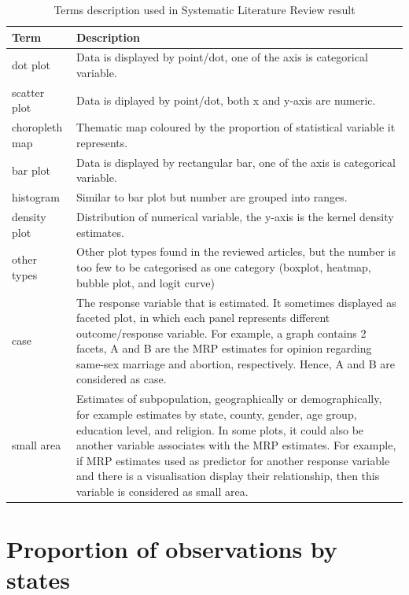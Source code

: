 \documentclass{monashthesis}
\begin{document}
\begin{table}

\caption{\label{tab:terms-desc}Terms description used in Systematic Literature Review result}
\centering
\begin{tabular}[t]{l>{\raggedright\arraybackslash}p{30em}}
\toprule
Term & Description\\
\midrule
dot plot & Data is displayed by point/dot, one of the axis is categorical variable.\\
scatter plot & Data is diplayed by point/dot, both x and y-axis are numeric.\\
choropleth map & Thematic map coloured by the proportion of statistical variable it represents.\\
bar plot & Data is displayed by rectangular bar, one of the axis is categorical variable.\\
histogram & Similar to bar plot but number are grouped into ranges.\\
\addlinespace
density plot & Distribution of numerical variable, the y-axis is the kernel density estimates.\\
other types & Other plot types found in the reviewed articles, but the number is too few to be categorised as one category (boxplot, heatmap, bubble plot, and logit curve)\\
case & The response variable that is estimated. It sometimes displayed as faceted plot, in which each panel represents different outcome/response variable. For example, a graph contains 2 facets, A and B are the MRP estimates for opinion regarding same-sex marriage and abortion, respectively. Hence, A and B are considered as case.\\
small area & Estimates of subpopulation, geographically or demographically, for example estimates by state, county, gender, age group, education level, and religion. In some plots, it could also be another variable associates with the MRP estimates. For example, if MRP estimates used as predictor for another response variable and there is a visualisation display their relationship, then this variable is considered as small area.\\
\bottomrule
\end{tabular}
\end{table}

\hypertarget{apd-state}{%
\section{Proportion of observations by states}\label{apd-state}}
\end{document}
